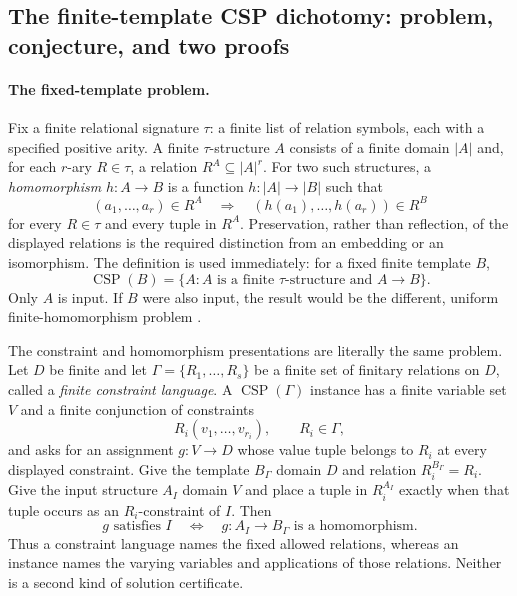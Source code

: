 
\subsection{The finite-template CSP dichotomy: problem, conjecture, and two proofs}
\label{sec:p09-presentation-n-c-025}

\paragraph{The fixed-template problem.}
Fix a finite relational signature \(\tau\): a finite list of relation symbols,
each with a specified positive arity.  A finite \(\tau\)-structure \(A\)
consists of a finite domain \(\lvert A\rvert\) and, for each \(r\)-ary
\(R\in\tau\), a relation \(R^A\subseteq\lvert A\rvert^r\).  For two such
structures, a \emph{homomorphism} \(h:A\to B\) is a function
\(h:\lvert A\rvert\to\lvert B\rvert\) such that
\[
 (a_1,\ldots,a_r)\in R^A
 \quad\Longrightarrow\quad
 (h(a_1),\ldots,h(a_r))\in R^B
\]
for every \(R\in\tau\) and every tuple in \(R^A\).  Preservation, rather than
reflection, of the displayed relations is the required distinction from an
embedding or an isomorphism.  The definition is used immediately: for a fixed
finite template \(B\),
\[
 \operatorname{CSP}(B)
   =\{A:A\text{ is a finite }\tau\text{-structure and }A\to B\}.
\]
Only \(A\) is input.  If \(B\) were also input, the result would be the
different, uniform finite-homomorphism problem
\cite[\S\S2--3]{FederVardi1998}.

The constraint and homomorphism presentations are literally the same problem.
Let \(D\) be finite and let
\(\Gamma=\{R_1,\ldots,R_s\}\) be a finite set of finitary relations on
\(D\), called a \emph{finite constraint language}.  A
\(\operatorname{CSP}(\Gamma)\) instance has a finite variable set \(V\) and a
finite conjunction of constraints
\[
 R_i(v_1,\ldots,v_{r_i}),
 \qquad R_i\in\Gamma,
\]
and asks for an assignment \(g:V\to D\) whose value tuple belongs to \(R_i\)
at every displayed constraint.  Give the template \(B_\Gamma\) domain \(D\)
and relation \(R_i^{B_\Gamma}=R_i\).  Give the input structure \(A_I\) domain
\(V\) and place a tuple in \(R_i^{A_I}\) exactly when that tuple occurs as an
\(R_i\)-constraint of \(I\).  Then
\[
 g\text{ satisfies }I
 \quad\Longleftrightarrow\quad
 g:A_I\to B_\Gamma\text{ is a homomorphism}.
\]
Thus a constraint language names the fixed allowed relations, whereas an
instance names the varying variables and applications of those relations.
Neither is a second kind of solution certificate.

